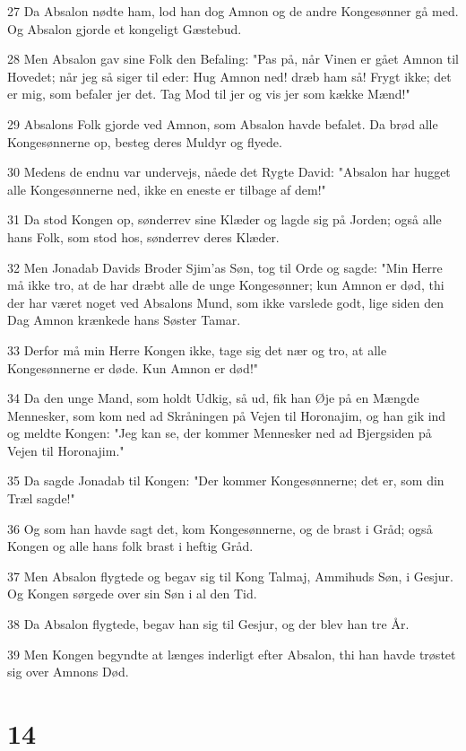 \par 27 Da Absalon nødte ham, lod han dog Amnon og de andre Kongesønner gå med. Og Absalon gjorde et kongeligt Gæstebud.
\par 28 Men Absalon gav sine Folk den Befaling: "Pas på, når Vinen er gået Amnon til Hovedet; når jeg så siger til eder: Hug Amnon ned! dræb ham så! Frygt ikke; det er mig, som befaler jer det. Tag Mod til jer og vis jer som kække Mænd!"
\par 29 Absalons Folk gjorde ved Amnon, som Absalon havde befalet. Da brød alle Kongesønnerne op, besteg deres Muldyr og flyede.
\par 30 Medens de endnu var undervejs, nåede det Rygte David: "Absalon har hugget alle Kongesønnerne ned, ikke en eneste er tilbage af dem!"
\par 31 Da stod Kongen op, sønderrev sine Klæder og lagde sig på Jorden; også alle hans Folk, som stod hos, sønderrev deres Klæder.
\par 32 Men Jonadab Davids Broder Sjim'as Søn, tog til Orde og sagde: "Min Herre må ikke tro, at de har dræbt alle de unge Kongesønner; kun Amnon er død, thi der har været noget ved Absalons Mund, som ikke varslede godt, lige siden den Dag Amnon krænkede hans Søster Tamar.
\par 33 Derfor må min Herre Kongen ikke, tage sig det nær og tro, at alle Kongesønnerne er døde. Kun Amnon er død!"
\par 34 Da den unge Mand, som holdt Udkig, så ud, fik han Øje på en Mængde Mennesker, som kom ned ad Skråningen på Vejen til Horonajim, og han gik ind og meldte Kongen: "Jeg kan se, der kommer Mennesker ned ad Bjergsiden på Vejen til Horonajim."
\par 35 Da sagde Jonadab til Kongen: "Der kommer Kongesønnerne; det er, som din Træl sagde!"
\par 36 Og som han havde sagt det, kom Kongesønnerne, og de brast i Gråd; også Kongen og alle hans folk brast i heftig Gråd.
\par 37 Men Absalon flygtede og begav sig til Kong Talmaj, Ammihuds Søn, i Gesjur. Og Kongen sørgede over sin Søn i al den Tid.
\par 38 Da Absalon flygtede, begav han sig til Gesjur, og der blev han tre År.
\par 39 Men Kongen begyndte at længes inderligt efter Absalon, thi han havde trøstet sig over Amnons Død.

\chapter{14}

